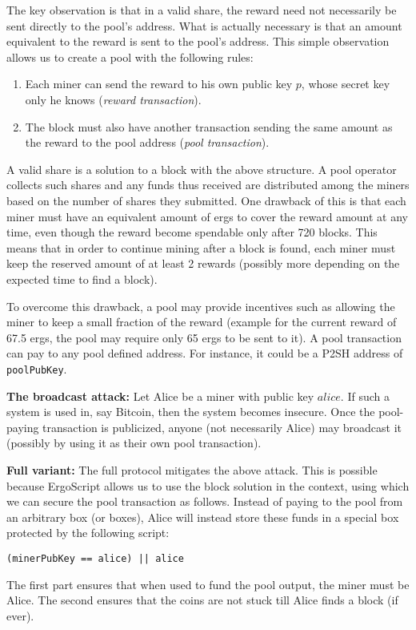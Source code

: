 \documentclass[11pt]{article}
\newcommand{\authnote}[2]{\marginpar{\parbox{\marginparwidth}{\tiny %
  \textsf{#1 {\textcolor{blue}{notes: #2}}}}}%
  \textcolor{blue}{\textbf{\dag}}}
\newcommand{\authnote}[2]{
  \textsf{#1 \textcolor{blue}{: #2}}}
\newcommand{\authnote}[2]{}
\newcommand{\snote}[1]{{\authnote{\textcolor{red}{Scalahub notes}}{#1}}}
\newcommand{\langname}{ErgoScript\xspace}
\begin{document}
The key observation is that in a valid share, the reward need not necessarily be sent directly to the pool's address. What is actually necessary is that an amount equivalent to the reward is sent to the pool's address. This simple observation allows us to create a pool with the following rules:
\begin{enumerate}
	\item Each miner can send the reward to his own public key $p$, whose secret key only he knows ({\em reward transaction}).
	\item The block must also have another transaction sending the same amount as the reward to the pool address ({\em pool transaction}).
\end{enumerate}

\snote{Maybe make this section less Ergo-specific}

A valid share is a solution to a block with the above structure. A pool operator collects such shares and any funds thus received are distributed among the miners based on the number of shares they submitted. One drawback of this is that each miner must have an equivalent amount of ergs to cover the reward amount at any time, even though the reward become spendable only after 720 blocks. 
This means that in order to continue mining after a block is found, each miner must keep the reserved amount of at least 2 rewards (possibly more depending on the expected time to find a block).

 To overcome this drawback, a pool may provide incentives such as allowing the miner to keep a small fraction of the reward (example for the current reward of 67.5 ergs, the pool may require only 65 ergs to be sent to it). A pool transaction can pay to any pool defined address. For instance, it could be a P2SH address of \texttt{poolPubKey}. 


\textbf{The broadcast attack:} Let Alice be a miner with public key $alice$. If such a system is used in, say Bitcoin, then the system becomes insecure. Once the pool-paying transaction is publicized, anyone (not necessarily Alice) may broadcast it (possibly by using it as their own pool transaction). 

\textbf{Full variant:} The full protocol mitigates the above attack. This is possible because \langname allows us to use the block solution in the context, using which we can secure the pool transaction as follows. Instead of paying to the pool from an arbitrary box (or boxes), Alice will instead store these funds in a special box protected by the following script:
\begin{verbatim}
(minerPubKey == alice) || alice
\end{verbatim}
The first part ensures that when used to fund the pool output, the miner must be Alice. The second ensures that the coins are not stuck till Alice finds a block (if ever). 
\end{document}
